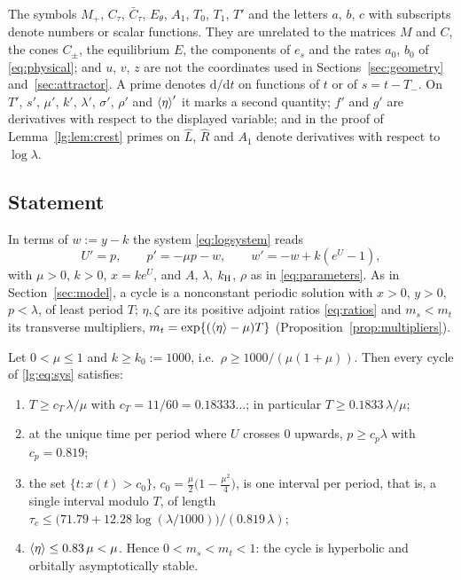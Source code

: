 The symbols $M_+$, $C_\tau$, $\bar C_\tau$, $E_\theta$, $A_1$, $T_0$, $T_1$, $T'$ and the letters $a$, $b$, $c$ with subscripts denote numbers or scalar functions. They are unrelated to the matrices $M$ and $C$, the cones $C_\pm$, the equilibrium $E$, the components of $e_s$ and the rates $a_0$, $b_0$ of \eqref{eq:physical}; and $u$, $v$, $z$ are not the coordinates used in Sections~\ref{sec:geometry} and~\ref{sec:attractor}.
A prime denotes $\mathrm d/\mathrm dt$ on functions of $t$ or of $s=t-T_-$. On $T'$, $s'$, $\mu'$, $k'$, $\lambda'$, $\sigma'$, $\rho'$ and $\left\langle \eta\right\rangle'$ it marks a second quantity; $f'$ and $g'$ are derivatives with respect to the displayed variable; and in the proof of Lemma~\ref{lg:lem:crest} primes on $\hat L$, $\hat R$ and $A_1$ denote derivatives with respect to $\log\lambda$.

\subsection{Statement}\label{lg:sec:statement}
In terms of $w:=y-k$ the system \eqref{eq:logsystem} reads
\begin{equation}\label{lg:eq:sys}
U'=p,\qquad p'=-\mu p-w,\qquad w'=-w+k(e^U-1),
\end{equation}
with $\mu>0$, $k>0$, $x=ke^U$, and $A$, $\lambda$, $k_{\mathrm H}$, $\rho$ as in \eqref{eq:parameters}. As in Section~\ref{sec:model}, a cycle is a nonconstant periodic solution with $x>0$, $y>0$,
$p<\lambda$, of least period $T$; $\eta,\zeta$ are its positive adjoint ratios \eqref{eq:ratios} and
$m_s<m_t$ its transverse multipliers, $m_t=\exp\{(\left\langle \eta\right\rangle-\mu)T\}$ (Proposition~\ref{prop:multipliers}).

\begin{theorem}\label{thm:largegain}
Let $0<\mu\le 1$ and $k\ge k_0:=1000$, i.e.\ $\rho\ge 1000/(\mu(1+\mu))$. Then every cycle of
\eqref{lg:eq:sys} satisfies:
\begin{enumerate}[label=\textup{(\roman*)}]
\item $T\ge c_T\,\lambda/\mu$ with $c_T=11/60=0.18333\ldots$; in particular $T\ge0.1833\,\lambda/\mu$;
\item at the unique time per period where $U$ crosses $0$ upwards, $p\ge c_p\lambda$ with $c_p=0.819$;
\item the set $\{t:x(t)>c_0\}$, $c_0=\tfrac{\mu}{2}\bigl(1-\tfrac{\mu^2}{4}\bigr)$, is one interval per period, that is, a single interval modulo $T$, of
length $\tau_c\le \bigl(71.79+12.28\log(\lambda/1000)\bigr)/(0.819\,\lambda)$;
\item $\left\langle \eta\right\rangle\le 0.83\,\mu<\mu$. Hence $0<m_s<m_t<1$: the cycle is hyperbolic and orbitally
asymptotically stable.
\end{enumerate}
\end{theorem}

